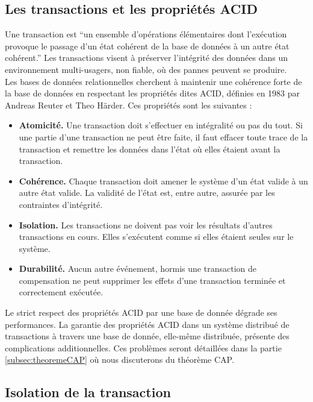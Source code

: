 \subsection{Les transactions et les propriétés ACID}
\label{subsec:proprietesACID}
	Une transaction est \enquote{un ensemble d'opérations élémentaires dont l'exécution provoque le passage d'un état cohérent de la base de données à un autre état cohérent.}\cite{cours_bdd_insa} Les transactions visent à préserver l'intégrité des données dans un environnement multi-usagers, non fiable, où des pannes peuvent se produire.\\

	Les bases de données relationnelles cherchent à maintenir une cohérence forte de la base de données en respectant les propriétés dites ACID, définies en 1983 par Andreas Reuter et Theo Härder. Ces propriétés sont les suivantes :
	\vspace{10px}
	\begin{itemize}
		\item \textbf{Atomicité.} Une transaction doit s'effectuer en intégralité ou pas du tout. Si une partie d'une transaction ne peut être faite, il faut effacer toute trace de la transaction et remettre les données dans l'état où elles étaient avant la transaction.
		\item \textbf{Cohérence.} Chaque transaction doit amener le système d'un état valide à un autre état valide. La validité de l'état est, entre autre, assurée par les contraintes d'intégrité.
		\item \textbf{Isolation.} Les transactions ne doivent pas voir les résultats d'autres transactions en cours. Elles s'exécutent comme si elles étaient seules sur le système.
		\item \textbf{Durabilité.} Aucun autre événement, hormis une transaction de compensation ne peut supprimer les effets d'une transaction terminée et correctement exécutée.
	\end{itemize}
	\vspace{20px}
	Le strict respect des propriétés ACID par une base de donnée dégrade ses performances. La garantie des propriétés ACID dans un système distribué de transactions à travers une base de donnée, elle-même distribuée, présente des complications additionnelles. Ces problèmes seront détaillées dans la partie \ref{subsec:theoremeCAP} où nous discuterons du théorème CAP.

\subsection{Isolation de la transaction}

